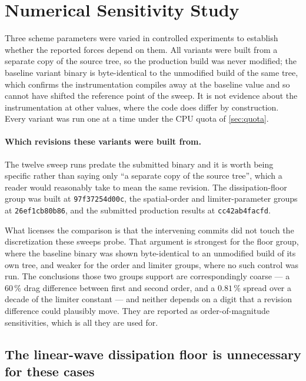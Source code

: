 \section{Numerical Sensitivity Study}
\label{sec:sensitivity}

Three scheme parameters were varied in controlled experiments to establish whether
the reported forces depend on them. All variants were built from a separate copy of
the source tree, so the production build was never modified; the baseline variant
binary is byte-identical to the unmodified build of the same tree, which confirms the
instrumentation compiles away at the baseline value and so cannot have shifted the
reference point of the sweep. It is not evidence about the instrumentation at other
values, where the code does differ by construction. Every variant was run one at a
time under the CPU quota of \cref{sec:quota}.

\paragraph{Which revisions these variants were built from.} The twelve sweep runs predate
the submitted binary and it is worth being specific rather than saying only ``a separate copy
of the source tree'', which a reader would reasonably take to mean the same revision. The
dissipation-floor group was built at \texttt{97f37254d00c}, the spatial-order and
limiter-parameter groups at \texttt{26ef1cb80b86}, and the submitted production results at
\texttt{cc42ab4facfd}.

What licenses the comparison is that the intervening commits did not touch the discretization
these sweeps probe. That argument is strongest for the floor group, where the baseline binary
was shown byte-identical to an unmodified build of its own tree, and weaker for the
order and limiter groups, where no such control was run. The conclusions those two groups
support are correspondingly coarse --- a $60\,\%$ drag difference between first and second
order, and a $0.81\,\%$ spread over a decade of the limiter constant --- and neither depends
on a digit that a revision difference could plausibly move. They are reported as
order-of-magnitude sensitivities, which is all they are used for.

\subsection{The linear-wave dissipation floor is unnecessary for these cases}
\label{sec:floorsens}

